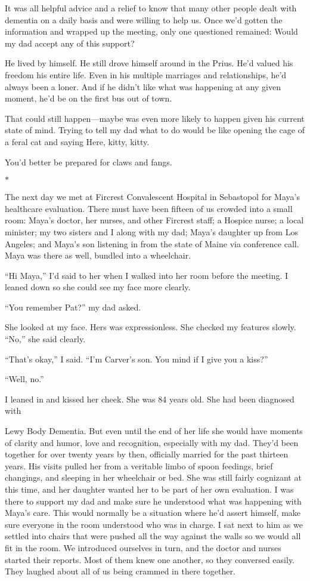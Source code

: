 \documentclass[12pt]{book}
\begin{document}
It was all helpful advice and a relief to know that many other people dealt with dementia on a daily basis and were willing to help us. Once we'd gotten the information and wrapped up the meeting, only one questioned remained: Would my dad accept any of this support?

He lived by himself. He still drove himself around in the Prius. He'd valued his freedom his entire life. Even in his multiple marriages and relationships, he'd always been a loner. And if he didn't like what was happening at any given moment, he'd be on the first bus out of town.

That could still happen---maybe was even more likely to happen given his current state of mind. Trying to tell my dad what to do would be like opening the cage of a feral cat and saying Here, kitty, kitty.

You'd better be prepared for claws and fangs.

\begin{center}$*$\end{center}

The next day we met at Fircrest Convalescent Hospital in Sebastopol for Maya's healthcare evaluation. There must have been fifteen of us crowded into a small room: Maya's doctor, her nurses, and other Fircrest staff; a Hospice nurse; a local minister; my two sisters and I along with my dad; Maya's daughter up from Los Angeles; and Maya's son listening in from the state of Maine via conference call. Maya was there as well, bundled into a wheelchair.

``Hi Maya,'' I'd said to her when I walked into her room before the meeting. I leaned down so she could see my face more clearly.

``You remember Pat?'' my dad asked.

She looked at my face. Hers was expressionless. She checked my features slowly. ``No,'' she said clearly.

``That's okay,'' I said. ``I'm Carver's son. You mind if I give you a kiss?''

``Well, no.''

I leaned in and kissed her cheek. She was 84 years old. She had been diagnosed with

Lewy Body Dementia. But even until the end of her life she would have moments of clarity and humor, love and recognition, especially with my dad. They'd been together for over twenty years by then, officially married for the past thirteen years. His visits pulled her from a veritable limbo of spoon feedings, brief changings, and sleeping in her wheelchair or bed. She was still fairly cognizant at this time, and her daughter wanted her to be part of her own evaluation. I was there to support my dad and make sure he understood what was happening with Maya's care. This would normally be a situation where he'd assert himself, make sure everyone in the room understood who was in charge. I sat next to him as we settled into chairs that were pushed all the way against the walls so we would all fit in the room. We introduced ourselves in turn, and the doctor and nurses started their reports. Most of them knew one another, so they conversed easily. They laughed about all of us being crammed in there together.
\end{document}

